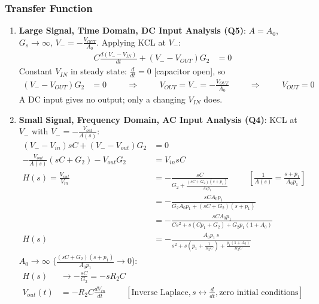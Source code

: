 \subsubsection{Transfer Function}
\begin{enumerate}
  \item \textbf{Large Signal, Time Domain, DC Input Analysis (Q5)}: \(A = A_0\),
    \(G_s \to \infty\), \(V_- = -\frac{V_{OUT}}{A_0}\). Applying KCL at \(V_-\):
    \begin{align*}
      C\frac{d(V_- - V_{IN})}{dt} + (V_- - V_{OUT}) G_2 &= 0
    \end{align*}
    Constant \(V_{IN}\) in steady state: \(\frac{d}{dt} = 0\) [capacitor open], so
    \begin{align*}
      (V_- - V_{OUT}) G_2 &= 0 \hspace{1cm} \Rightarrow \hspace{1cm} V_{OUT} = V_- = -\frac{V_{OUT}}{A_0} \hspace{1cm} \Rightarrow \hspace{1cm} V_{OUT} = 0
    \end{align*}
    A DC input gives no output; only a changing \(V_{IN}\) does.
  \item \textbf{Small Signal, Frequency Domain, AC Input Analysis (Q4)}: KCL at \(V_-\) with
    \(V_- = -\frac{V_{out}}{A(s)}\):
    \begin{align*}
      (V_- - V_{in}) sC + (V_- - V_{out}) G_2 &= 0 \\
      -\frac{V_{out}}{A(s)}(sC + G_2) - V_{out} G_2 &= V_{in} sC \\
      H(s) = \frac{V_{out}}{V_{in}} &= -\frac{sC}{G_2 + \frac{(sC + G_2)(s + p_1)}{A_0 p_1}} \hspace{1cm} \left[\tfrac{1}{A(s)} = \tfrac{s + p_1}{A_0 p_1}\right] \\
      &= -\frac{sC A_0 p_1}{G_2 A_0 p_1 + (sC + G_2)(s + p_1)} \\
      &= -\frac{sC A_0 p_1}{C s^2 + s(C p_1 + G_2) + G_2 p_1(1 + A_0)} \\
      H(s) &= -\frac{A_0 p_1\, s}{s^2 + s\left(p_1 + \frac{1}{R_2 C}\right) + \frac{p_1(1 + A_0)}{R_2 C}} \tag{1}
    \end{align*}
    \(A_0 \to \infty\) (\(\frac{(sC + G_2)(s + p_1)}{A_0 p_1} \to 0\)):
    \begin{align*}
      H(s) &\to -\frac{sC}{G_2} = -s R_2 C \\
      V_{out}(t) &= -R_2 C \frac{dV_{in}}{dt} \hspace{1cm} [\text{Inverse Laplace}, s \leftrightarrow \tfrac{d}{dt}, \text{zero initial conditions}]
    \end{align*}
\end{enumerate}

